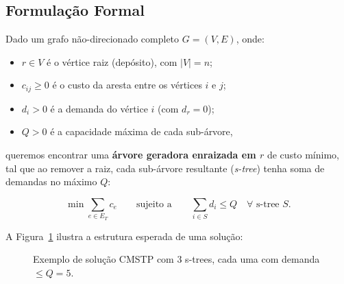 \documentclass[12pt, a4paper]{article}
\begin{document}
\subsection{Formulação Formal}

Dado um grafo não-direcionado completo $G = (V, E)$, onde:
\begin{itemize}
    \item $r \in V$ é o vértice raiz (depósito), com $|V| = n$;
    \item $c_{ij} \geq 0$ é o custo da aresta entre os vértices $i$ e $j$;
    \item $d_i > 0$ é a demanda do vértice $i$ (com $d_r = 0$);
    \item $Q > 0$ é a capacidade máxima de cada sub-árvore,
\end{itemize}

queremos encontrar uma \textbf{árvore geradora enraizada em $r$} de custo mínimo, tal que ao remover a raiz, cada sub-árvore resultante (\textit{s-tree}) tenha soma de demandas no máximo $Q$:

\[
\min \sum_{e \in E_T} c_e \qquad \text{sujeito a} \qquad \sum_{i \in S} d_i \leq Q \quad \forall \text{ s-tree } S.
\]

A Figura~\ref{fig:exemplo_cmstp} ilustra a estrutura esperada de uma solução:

\begin{figure}[H]
\centering
{}
\caption{Exemplo de solução CMSTP com 3 s-trees, cada uma com demanda $\leq Q = 5$.}
\label{fig:exemplo_cmstp}
\end{figure}
\end{document}
